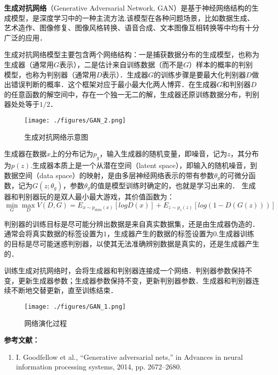 
\textbf{生成对抗网络}（Generative Adversarial Network, GAN）是基于神经网络结构的生成模型，是深度学习中的一种主流方法.该模型在各种问题场景，比如数据生成、艺术造作、图像修复、图像风格转换、语音合成、文本图像互相转换等中均有十分广泛的应用．

生成对抗网络模型主要包含两个网络结构：一是捕获数据分布的生成模型，也称为生成器（通常用$G$表示），二是估计来自训练数据（而不是$G$）样本的概率的判别模型，也称为判别器（通常用$D$表示）．生成器$G$的训练步骤是要最大化判别器$D$做出错误判断的概率．这个框架对应于最小最大化两人博弈．在生成器$G$和判别器$D$的任意函数的解空间中，存在一个独一无二的解，生成器还原训练数据分布，判别器处处等于$1/2$．

\begin{figure}[ht]
\centering
\texttt{[image: ./figures/GAN\_2.png]}
\caption{生成对抗网络示意图} \label{GAN_fig2}
\end{figure}

生成器在数据$x$上的分布记为$p_g$，输入生成器的随机变量，即噪音，记为$z$，其分布为$p(z)$.生成器本质上是一个从潜在空间（latent space），即输入的随机噪音，到数据空间（data space）的映射，是由多层神经网络表示的带有参数$\theta_g$的可微分函数，记为$G(z;\theta_g)$，参数$\theta_g$的值是模型训练时确定的，也就是学习出来的．
生成器和判别器玩的是双人最小最大游戏，其价值函数为：
\begin{equation}
\mathop{\min}\limits_G \mathop {\max }\limits_D V(D,G)=E_{x\sim p_{data}(x)}[logD(x)]+E_{z\sim p_z(z)}[log(1-D(G(z)))]
\end{equation}


判别器的训练目标是尽可能分辨出数据是来自真实数据集，还是由生成器伪造的．通常会将真实数据的标签设置为$1$，生成器产生的数据的标签设置为$0$.生成器训练的目标是尽可能迷惑判别器，以使其无法准确辨别数据是真实的，还是生成器产生的．

训练生成对抗网络时，会将生成器和判别器连接成一个网络．判别器参数保持不变，更新生成器参数；生成器参数保持不变，更新判别器参数．生成器和判别器连续不断地交替更新，直至训练结束．
\begin{figure}[ht]
\centering
\texttt{[image: ./figures/GAN\_1.png]}
\caption{网络演化过程} \label{GAN_fig1}
\end{figure}





\textbf{参考文献：}
\begin{enumerate}
\item I. Goodfellow et al., “Generative adversarial nets,” in Advances in neural information processing systems, 2014, pp. 2672–2680.
\end{enumerate}